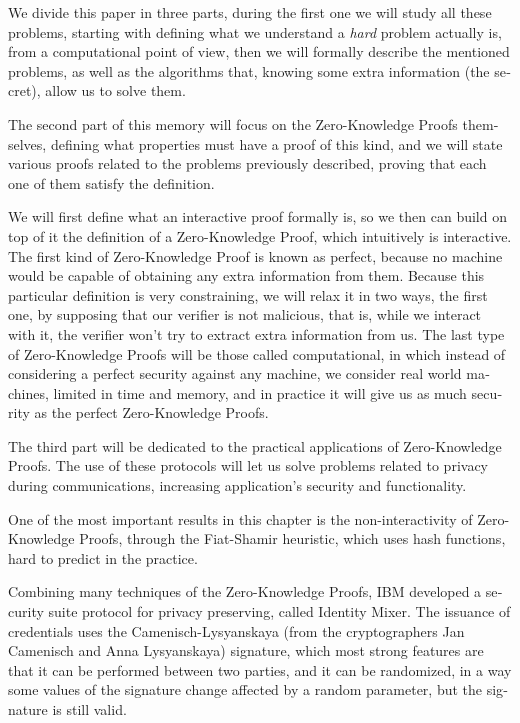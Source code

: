 \begin{otherlanguage}{english}
We divide this paper in three parts, during the first one we will study all these problems, starting with defining what we understand a \textit{hard} problem actually is, from a computational point of view, then we will formally describe the mentioned problems, as well as the algorithms that, knowing some extra information (the secret), allow us to solve them.

The second part of this memory will focus on the Zero-Knowledge Proofs themselves, defining what properties must have a proof of this kind, and we will state various proofs related to the problems previously described, proving that each one of them satisfy the definition.

We will first define what an interactive proof formally is, so we then can build on top of it the definition of a Zero-Knowledge Proof, which intuitively is interactive. The first kind of Zero-Knowledge Proof is known as perfect, because no machine would be capable of obtaining any extra information from them. Because this particular definition is very constraining, we will relax it in two ways, the first one, by supposing that our verifier is not malicious, that is, while we interact with it, the verifier won't try to extract extra information from us. The last type of Zero-Knowledge Proofs will be those called computational, in which instead of considering a perfect security against any machine, we consider real world machines, limited in time and memory, and in practice it will give us as much security as the perfect Zero-Knowledge Proofs.


The third part will be dedicated to the practical applications of Zero-Knowledge Proofs. The use of these protocols will let us solve problems related to privacy during communications, increasing application's security and functionality.

One of the most important results in this chapter is the non-interactivity of Zero-Knowledge Proofs, through the Fiat-Shamir heuristic, which uses hash functions, hard to predict in the practice.

Combining many techniques of the Zero-Knowledge Proofs, IBM developed a security suite protocol for privacy preserving, called Identity Mixer. The issuance of credentials uses the Camenisch-Lysyanskaya (from the cryptographers Jan Camenisch and Anna Lysyanskaya) signature, which most strong features are that it can be performed between two parties, and it can be randomized, in a way some values of the signature change affected by a random parameter, but the signature is still valid.


\end{otherlanguage}

